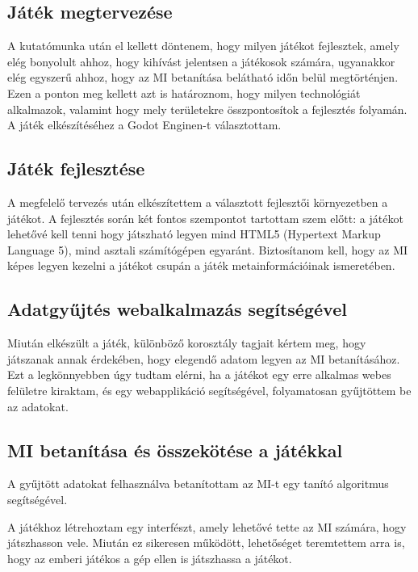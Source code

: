 \subsection{Játék megtervezése}
A kutatómunka után el kellett döntenem, hogy milyen játékot fejlesztek, amely elég bonyolult ahhoz, hogy kihívást jelentsen a játékosok számára, ugyanakkor elég egyszerű ahhoz, hogy az MI betanítása belátható időn belül megtörténjen. Ezen a ponton meg kellett azt is határoznom, hogy milyen technológiát alkalmazok, valamint hogy mely területekre összpontosítok a fejlesztés folyamán. A játék elkészítéséhez a Godot Enginen-t választottam.

\subsection{Játék fejlesztése}
A megfelelő tervezés után elkészítettem a választott fejlesztői környezetben a játékot. A fejlesztés során két fontos szempontot tartottam szem előtt: a játékot lehetővé kell tenni hogy játszható legyen mind HTML5 (Hypertext Markup Language 5), mind asztali számítógépen egyaránt. Biztosítanom kell, hogy az MI képes legyen kezelni a játékot csupán a játék metainformációinak ismeretében.

\subsection{Adatgyűjtés webalkalmazás segítségével}
Miután elkészült a játék, különböző korosztály tagjait kértem meg, hogy játszanak annak érdekében, hogy elegendő adatom legyen az MI betanításához. Ezt a legkönnyebben úgy tudtam elérni, ha a játékot egy erre alkalmas webes felületre kiraktam, és egy webapplikáció segítségével, folyamatosan gyűjtöttem be az adatokat. 

\subsection{MI betanítása és összekötése a játékkal}
A gyűjtött adatokat felhasználva betanítottam az MI-t egy tanító algoritmus segítségével.

A játékhoz létrehoztam egy interfészt, amely lehetővé tette az MI számára, hogy játszhasson vele. Miután ez sikeresen működött, lehetőséget teremtettem arra is, hogy az emberi játékos a gép ellen is játszhassa a játékot.